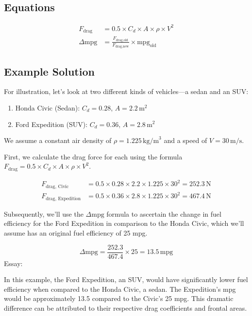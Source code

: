 \documentclass[12pt]{article}
\begin{document}
\subsection*{Equations}
\begin{align*}
F_{\text{drag}} &= 0.5 \times C_d \times A \times \rho \times V^2 \\
\Delta \text{mpg} &= \frac{F_{\text{drag,old}}}{F_{\text{drag,new}}} \times \text{mpg}_{\text{old}}
\end{align*}

\newpage
\subsection*{Example Solution}
For illustration, let's look at two different kinds of vehicles—a sedan and an SUV:

\begin{enumerate}[label=\alph*.]
    \item Honda Civic (Sedan): \(C_d = 0.28\), \(A = 2.2 \, \text{m}^2\)
    \item Ford Expedition (SUV): \(C_d = 0.36\), \(A = 2.8 \, \text{m}^2\)
\end{enumerate}

We assume a constant air density of \(\rho = 1.225 \, \text{kg/m}^3\) and a speed of \(V = 30 \, \text{m/s}\).

First, we calculate the drag force for each using the formula \(F_{\text{drag}} = 0.5 \times C_d \times A \times \rho \times V^2\).

\begin{align*}
F_{\text{drag, Civic}} &= 0.5 \times 0.28 \times 2.2 \times 1.225 \times 30^2 = 252.3 \, \text{N} \\
F_{\text{drag, Expedition}} &= 0.5 \times 0.36 \times 2.8 \times 1.225 \times 30^2 = 467.4 \, \text{N}
\end{align*}

Subsequently, we'll use the \(\Delta \text{mpg}\) formula to ascertain the change in fuel efficiency for the Ford Expedition in comparison to the Honda Civic, which we'll assume has an original fuel efficiency of 25 mpg.

\[
\Delta \text{mpg} = \frac{252.3}{467.4} \times 25 = 13.5 \, \text{mpg}
\]
\newline
Essay:

In this example, the Ford Expedition, an SUV, would have significantly lower fuel efficiency when compared to the Honda Civic, a sedan. The Expedition's mpg would be approximately 13.5 compared to the Civic's 25 mpg. This dramatic difference can be attributed to their respective drag coefficients and frontal areas. 
\end{document}
